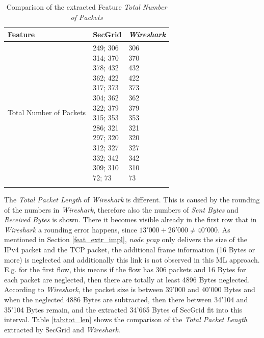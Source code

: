 \begin{center}
\begin{longtable}{ |l|l|l| }
\hline
Feature & SecGrid & \textit{Wireshark} \\
\hline
Total Number of Packets & \makecell{
249; 306 \\
314; 370 \\
378; 432 \\
362; 422 \\
317; 373 \\
304; 362 \\
322; 379 \\
315; 353 \\
286; 321 \\
297; 320 \\
312; 327 \\
332; 342 \\
309; 310 \\
72; 73 \\
} & \makecell{
306 \\
370 \\
432 \\
422 \\
373 \\
362 \\
379 \\
353 \\
321 \\
320 \\
327 \\
342 \\
310 \\
73
} \\
\hline
\caption{Comparison of the extracted Feature \textit{Total Number of Packets}}
\end{longtable}
\label{tab:ws_tot_no}
\end{center}

The \textit{Total Packet Length} of \textit{Wireshark} is different. This is caused by the rounding of the numbers in \textit{Wireshark}, therefore also the numbers of \textit{Sent Bytes} and \textit{Received Bytes} is shown. There it becomes visible already in the first row that in \textit{Wireshark} a rounding error happens, since $13'000 + 26'000 \neq 40'000$. As mentioned in Section \ref{feat_extr_impl}, \textit{node pcap} only delivers the size of the IPv4 packet and the TCP packet, the additional frame information (16 Bytes or more) is neglected and additionally this link is not observed in this ML approach. E.g. for the first flow, this means if the flow has 306 packets and 16 Bytes for each packet are neglected, then there are totally at least 4896 Bytes neglected. According to \textit{Wireshark}, the packet size is between 39'000 and 40'000 Bytes and when the neglected 4886 Bytes are subtracted, then there between 34'104 and 35'104 Bytes remain, and the extracted 34'665 Bytes of SecGrid fit into this interval. Table \ref{tab:tot_len} shows the comparison of the \textit{Total Packet Length} extracted by SecGrid and \textit{Wireshark}.


